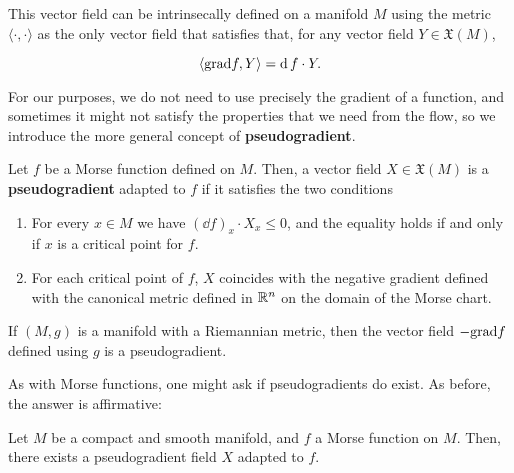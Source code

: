 This vector field can be intrinsecally defined on a manifold $M$ using the metric $\langle \cdot , \cdot \rangle$ as the only vector field that satisfies that, for any vector field $Y \in \mathfrak{X}(M)$,

$$\langle \text{grad} f, Y \rangle = \operatorname d f \cdot Y .$$

For our purposes, we do not need to use precisely the gradient of a function, and sometimes it might not satisfy the properties that we need from the flow, so we introduce the more general concept of {\bf pseudogradient}.

\begin{deff}
Let $f$ be a Morse function defined on $M$. Then, a vector field $X \in \mathfrak{X}(M)$ is a {\bf pseudogradient} adapted to $f$ if it satisfies the two conditions

\begin{enumerate}
\item For every $x \in M$ we have $(\dd f)_x \cdot X_x \leq 0$, and the equality holds if and only if $x$ is a critical point for $f$.
\item For each critical point of $f$, $X$ coincides with the negative gradient defined with the canonical metric defined in $\mathbb{R}^n$ on the domain of the Morse chart.
\end{enumerate}
\end{deff}

\begin{rmrk}
If $(M,g)$ is a manifold with a Riemannian metric, then the vector field $- \text{grad} f$ defined using $g$ is a pseudogradient.
\end{rmrk}

As with Morse functions, one might ask if pseudogradients do exist. As before, the answer is affirmative:

\begin{prop}
Let $M$ be a compact and smooth manifold, and $f$ a Morse function on $M$. Then, there exists a pseudogradient field $X$ adapted to $f$.
\end{prop}

